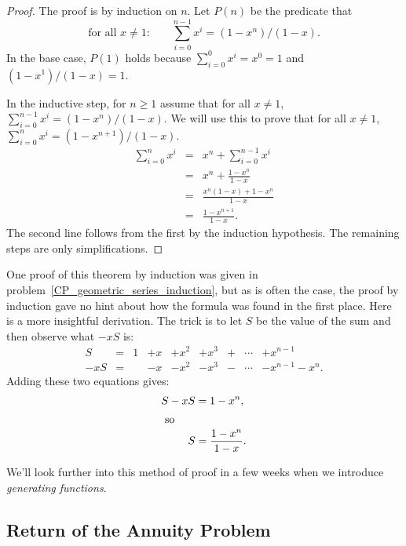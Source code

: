 \begin{proof}
The proof is by induction on $n$.  Let $P(n)$ be the predicate that
\[
\text{for all $x \neq 1$:} \qquad
\sum_{i=0}^{n-1} x^i = (1 - x^n)/(1 - x).
\]
In the base case, $P(1)$ holds because $\sum_{i=0}^{0} x^i = x^0 = 1$
and $(1 - x^1)/(1 - x) = 1$.

In the inductive step, for $n \geq 1$ assume that for all $x \neq 1$,
$\sum_{i=0}^{n-1} x^i = (1 - x^n)/(1 - x)$.  We will use this to prove
that for all $x \neq 1$, $\sum_{i=0}^{n} x^i = (1 - x^{n+1})/(1 - x)$.
\begin{eqnarray*}
\sum_{i=0}^{n} x^i & = & x^n + \sum_{i=0}^{n-1} x^i \\
                   & = & x^n + \frac{1 - x^n}{1 - x} \\
                   & = & \frac{x^n (1-x) + 1 - x^n}{1 - x} \\
                   & = & \frac{1 - x^{n+1}}{1 - x}.
\end{eqnarray*}
The second line follows from the first by the induction hypothesis.
The remaining steps are only simplifications.
\end{proof}
\fi

One proof of this theorem by induction was given in
problem~\ref{CP_geometric_series_induction}, but as is often the case, the
proof by induction gave no hint about how the formula was found in the
first place.  Here is a more insightful derivation.  The trick is to let
$S$ be the value of the sum and then observe what $-xS$ is:
\[\begin{array}{rclllllcl}
  S & = & 1 & +  x & + x^2 & + x^3 & + &\cdots & + x^{n-1} \\
-xS & = &   & -  x & - x^2 & - x^3 & - &\cdots & - x^{n-1} - x^{n}.
\end{array}\]
Adding these two equations gives:
\begin{align*}
S-xS  & =  1 - x^n, \\
\intertext{  so}
S     & = \frac{1 - x^n}{1 - x}.
\end{align*}

We'll look further into this method of proof in a few weeks when we
introduce \emph{generating functions}.

\subsection{Return of the Annuity Problem}

